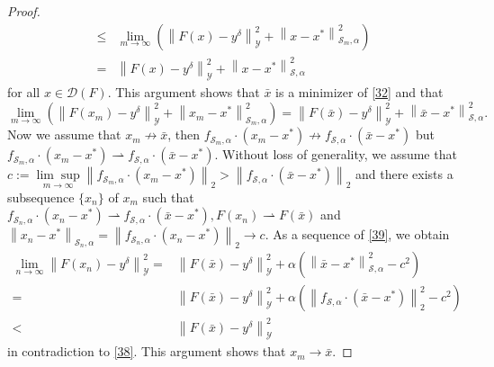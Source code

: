 \documentclass[11pt]{article}
\begin{document}
\begin{proof}
\begin{displaymath}
\begin{aligned}
\leq
&\lim_{m\to\infty}\left(\left\|F(x) - y^\delta\right\|^2_\mathcal{Y} + \left\|x - x^*\right\|_{\mathcal{S}_m, \alpha}^2\right)\\
=
&\left\|F(x) - y^\delta\right\|^2_\mathcal{Y} + \left\|x - x^*\right\|_{\mathcal{S}, \alpha}^2
\end{aligned}
\end{displaymath}
for all $ x\in \mathcal{D}(F) $. This argument shows that $\bar{x}$ is a minimizer of \eqref{32} and that
\begin{equation}\label{39}
\lim_{m\to\infty}\left(\left\|F(x_m) - y^\delta\right\|^2_\mathcal{Y} + \left\|x_m - x^*\right\|_{\mathcal{S}_m, \alpha}^2\right) = \left\|F(\bar{x}) - y^\delta\right\|^2_\mathcal{Y} + \left\|\bar{x} - x^*\right\|_{\mathcal{S}, \alpha}^2.
\end{equation}
Now we assume that $ x_m\not\to\bar{x} $, then $ f_{\mathcal{S}_m,\alpha}\cdot(x_m-x^*)\not\to f_{\mathcal{S},\alpha}\cdot(\bar{x}-x^*) $ but $ f_{\mathcal{S}_m,\alpha}\cdot(x_m-x^*)\rightharpoonup f_{\mathcal{S},\alpha}\cdot(\bar{x}-x^*) $.
Without loss of generality, we assume that $ c := \underset{m\to \infty}{\lim\sup}\left\|f_{\mathcal{S}_m,\alpha}\cdot(x_m-x^*)\right\|_2 > \left\|f_{\mathcal{S},\alpha}\cdot(\bar{x}-x^*)\right\|_2 $ and there exists a subsequence $ \{x_n\} $ of $ x_m $ such that $ f_{\mathcal{S}_n,\alpha}\cdot(x_n-x^*)\rightharpoonup f_{\mathcal{S},\alpha}\cdot(\bar{x}-x^*), F(x_n)\rightharpoonup F(\bar{x}) $ and $ \left\|x_n-x^*\right\|_{\mathcal{S}_n, \alpha} = \left\|f_{\mathcal{S}_n,\alpha}\cdot(x_n-x^*)\right\|_2\to c $. As a sequence of \eqref{39}, we obtain
\begin{equation*}\label{310}
\begin{aligned}
\lim_{n\to\infty}\left\|F(x_n) - y^\delta\right\|^2_\mathcal{Y} =
&\left\|F(\bar{x}) - y^\delta\right\|^2_\mathcal{Y} + \alpha\left(\left\|\bar{x} - x^*\right\|_{\mathcal{S}, \alpha}^2 - c^2\right)\\
=&\left\|F(\bar{x}) - y^\delta\right\|^2_\mathcal{Y} + \alpha\left(\left\|f_{\mathcal{S},\alpha}\cdot(\bar{x}-x^*)\right\|_2^2 - c^2\right)\\
<&\left\|F(\bar{x}) - y^\delta\right\|^2_\mathcal{Y}
\end{aligned}
\end{equation*}
in contradiction to \eqref{38}.
This argument shows that $ x_m\to \bar{x} $.
\end{proof}
\end{document}
